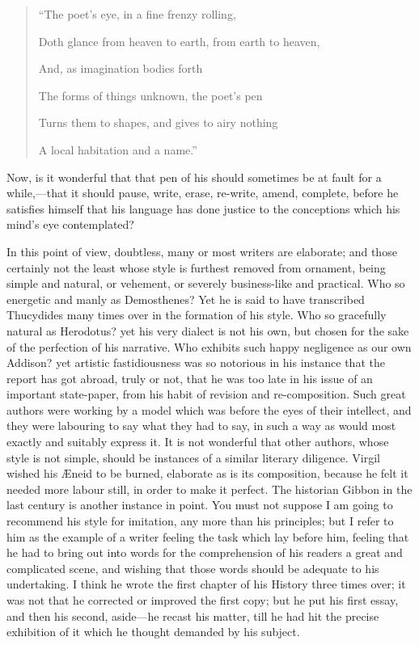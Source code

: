 \begin{quote}

``The poet's eye, in a fine frenzy rolling,

Doth glance from heaven to earth, from earth to heaven,

And, as imagination bodies forth

The forms of things unknown, the poet's pen

Turns them to shapes, and gives to airy nothing

A local habitation and a name.''

\end{quote}

Now, is it wonderful that that pen of his should sometimes be at
fault for a while,—that it should pause, write, erase, re-write,
amend, complete, before he satisfies himself that his language has
done justice to the conceptions which his mind's eye contemplated?

In this point of view, doubtless, many or most writers are
elaborate; and those certainly not the least whose style is furthest
removed from ornament, being simple and natural, or vehement, or
severely business-like and practical. Who so energetic and manly as
Demosthenes? Yet he is said to have transcribed Thucydides many times
over in the formation of his style. Who so gracefully natural as
Herodotus? yet his very dialect is not his own, but chosen for the
sake of the perfection of his narrative. Who exhibits such happy
negligence as our own Addison? yet artistic fastidiousness was so
notorious in his instance that the report has got abroad, truly or
not, that he was too late in his issue of an important state-paper,
from his habit of revision and re-composition. Such great authors were
working by a model which was before the eyes of their intellect, and
they were labouring to say what they had to say, in such a way as
would most exactly and suitably express it. It is not wonderful that
other authors, whose style is not simple, should be instances of a
similar literary diligence. Virgil wished his Æneid to be burned,
elaborate as is its composition, because he felt it needed more labour
still, in order to make it perfect. The historian Gibbon in the
last century is another instance in point. You must not suppose I am
going to recommend his style for imitation, any more than his
principles; but I refer to him as the example of a writer feeling the
task which lay before him, feeling that he had to bring out into words
for the comprehension of his readers a great and complicated scene,
and wishing that those words should be adequate to his undertaking. I
think he wrote the first chapter of his History three times over; it
was not that he corrected or improved the first copy; but he put his
first essay, and then his second, aside—he recast his matter, till
he had hit the precise exhibition of it which he thought demanded by
his subject.

